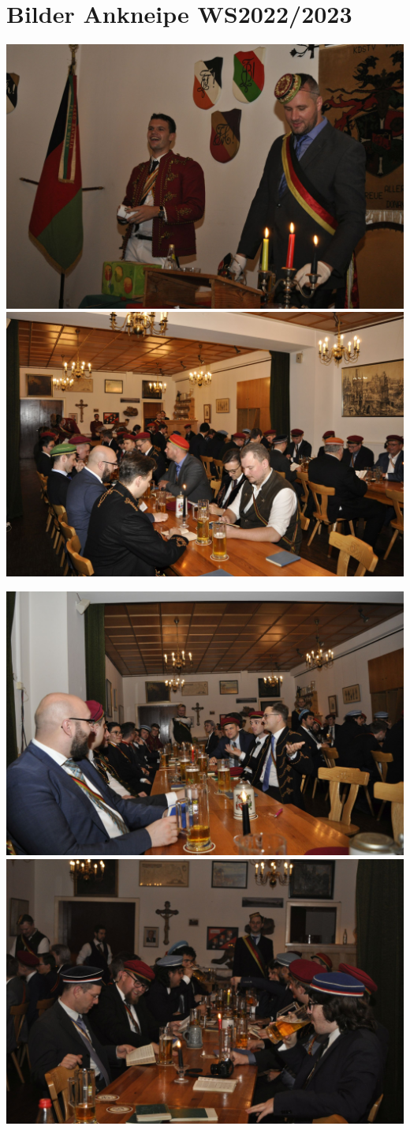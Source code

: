 \section{Bilder Ankneipe WS2022/2023}




	
	\begin{figurehere}
		
			\includegraphics[width=.45\linewidth]{Bilder/ankneipe/AnkneipeWS2022 (1).JPG}
		    \includegraphics[width=.45\linewidth]{Bilder/ankneipe/AnkneipeWS2022 (2).JPG}
		    
		    \includegraphics[width=.45\linewidth]{Bilder/ankneipe/AnkneipeWS2022 (3).JPG}
		    \includegraphics[width=.45\linewidth]{Bilder/ankneipe/AnkneipeWS2022 (4).JPG}
		    
	\end{figurehere}
	

	

%
